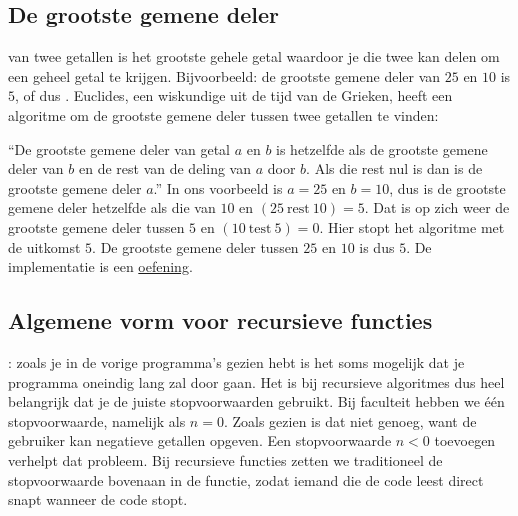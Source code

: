   \subsection{De grootste gemene deler}
  van twee getallen is het grootste gehele getal waardoor je die twee kan delen
  om een geheel getal te krijgen. Bijvoorbeeld: de grootste gemene deler van
  $25$ en $10$ is $5$, of dus . Euclides, een wiskundige
  uit de tijd van de Grieken, heeft een algoritme om de grootste gemene deler
  tussen twee getallen te vinden:

  ``De grootste gemene deler van getal $a$ en $b$ is hetzelfde als de grootste
  gemene deler van $b$ en de rest van de deling van $a$ door $b$. Als die rest
  nul is dan is de grootste gemene deler $a$.'' In ons voorbeeld is $a = 25$ en $b
  = 10$, dus is de grootste gemene deler hetzelfde als die van $10$ en $(25\
  \text{rest}\ 10) = 5$. Dat is op zich weer de grootste gemene deler tussen $5$
  en $(10\ \text{test}\ 5) = 0$. Hier stopt het algoritme met de uitkomst $5$. De
  grootste gemene deler tussen $25$ en $10$ is dus $5$. De implementatie is een
  \href{https://github.com/TGThorax/python-ka2ring/blob/master/src/ggd.py}{oefening}.
\subsection{Algemene vorm voor recursieve functies}:
  zoals je in de vorige programma's gezien hebt is het soms mogelijk dat je
  programma oneindig lang zal door gaan. Het is bij recursieve algoritmes dus
  heel belangrijk dat je de juiste stopvoorwaarden gebruikt. Bij faculteit
  hebben we \'e\'en stopvoorwaarde, namelijk als $n=0$. Zoals gezien is dat niet
  genoeg, want de gebruiker kan negatieve getallen opgeven. Een stopvoorwaarde
  $n<0$ toevoegen verhelpt dat probleem. Bij recursieve functies zetten we
  traditioneel de stopvoorwaarde bovenaan in de functie, zodat iemand die de
  code leest direct snapt wanneer de code stopt.
